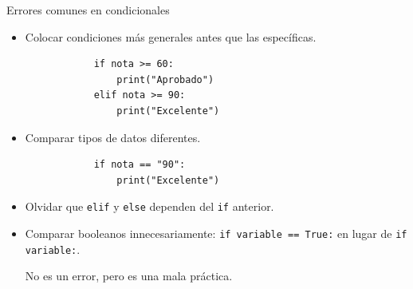 \documentclass{beamer}
\begin{document}
    \begin{frame}[fragile,t]{Errores comunes en condicionales}
        \begin{itemize}
            \item Colocar condiciones más generales antes que las específicas.
            \begin{verbatim}
            if nota >= 60:
                print("Aprobado")
            elif nota >= 90:
                print("Excelente")
            \end{verbatim}
            \item Comparar tipos de datos diferentes.
            \begin{verbatim}
            if nota == "90":
                print("Excelente")
            \end{verbatim}
            \item Olvidar que \texttt{elif} y \texttt{else} 
            dependen del \texttt{if} anterior.
            \item Comparar booleanos innecesariamente: \texttt{if variable == True:}
            en lugar de \texttt{if variable:}. 
            
            No es un error, pero es una mala práctica.
        \end{itemize}
    \end{frame}


   
\end{document}
